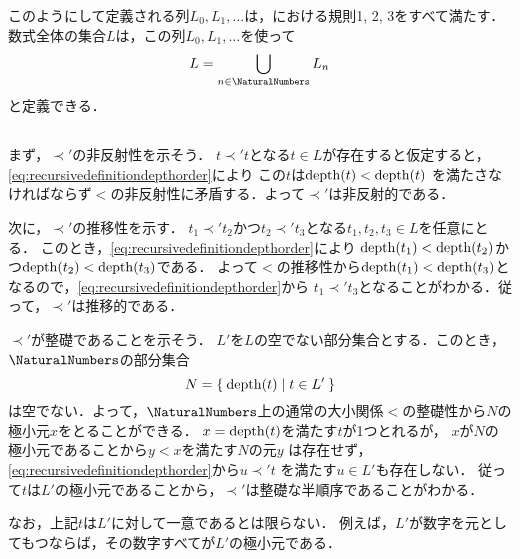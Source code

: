 このようにして定義される列\(L_0, L_1, \dots\)は，における規則1, 2, 3をすべて満たす．
数式全体の集合\(L\)は，この列\(L_0, L_1, \dots\)を使って
\begin{equation*}
	L = \bigcup_{n \in \NaturalNumbers} L_n
\end{equation*}
と定義できる．

\subsection*{}

まず，\(\prec'\)の非反射性を示そう．
\(t \prec' t\)となる\(t \in L\)が存在すると仮定すると，\cref{eq:recursivedefinitiondepthorder}により
この\(t\)は\(\apply{\depth}{t} < \apply{\depth}{t}\)
を満たさなければならず\(<\)の非反射性に矛盾する．よって\(\prec'\)は非反射的である．

次に，\(\prec'\)の推移性を示す．
\(t_1 \prec' t_2\)かつ\(t_2 \prec' t_3\)となる\(t_1, t_2, t_3 \in L\)を任意にとる．
このとき，\cref{eq:recursivedefinitiondepthorder}により
\(\apply{\depth}{t_1} < \apply{\depth}{t_2}\)かつ\(\apply{\depth}{t_2} < \apply{\depth}{t_3}\)である．
よって\(<\)の推移性から\(\apply{\depth}{t_1} < \apply{\depth}{t_3}\)となるので，\cref{eq:recursivedefinitiondepthorder}から
\(t_1 \prec' t_3\)となることがわかる．従って，\(\prec'\)は推移的である．

\(\prec'\)が整礎であることを示そう．
\(L'\)を\(L\)の空でない部分集合とする．このとき，\(\NaturalNumbers\)の部分集合
\begin{equation*}
	N = \Set{\apply{\depth}{t} | t \in L'}
\end{equation*}
は空でない．よって，\(\NaturalNumbers\)上の通常の大小関係\(<\)の整礎性から\(N\)の極小元\(x\)をとることができる．
\(x = \apply{\depth}{t}\)を満たす\(t\)が1つとれるが，
\(x\)が\(N\)の極小元であることから\(y < x\)を満たす\(N\)の元\(y\)
は存在せず，\cref{eq:recursivedefinitiondepthorder}から\(u \prec' t\)
を満たす\(u \in L'\)も存在しない．
従って\(t\)は\(L'\)の極小元であることから，\(\prec'\)は整礎な半順序であることがわかる．

なお，上記\(t\)は\(L'\)に対して一意であるとは限らない．
例えば，\(L'\)が数字を元としてもつならば，その数字すべてが\(L'\)の極小元である．

\subsection*{}

